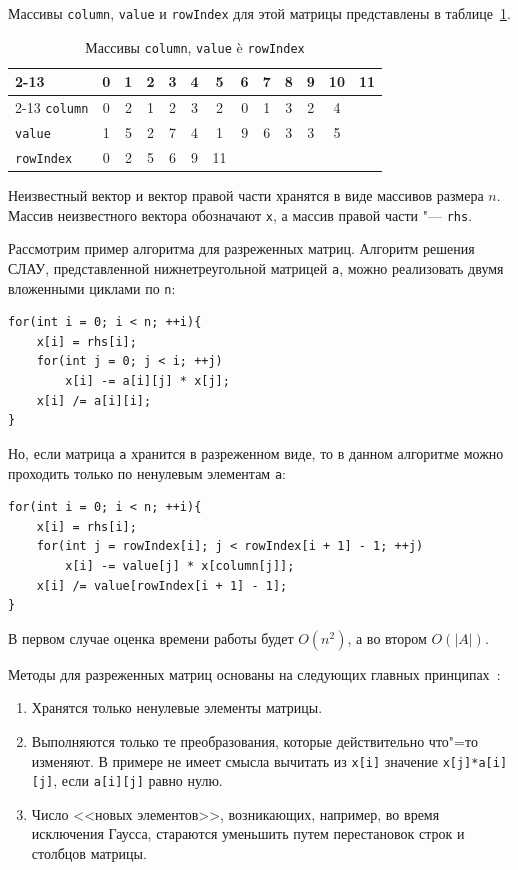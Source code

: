 \documentclass[bachelor, och, coursework]{SCWorks}
\begin{document}
Массивы \verb"column", \verb"value" и \verb"rowIndex" для этой матрицы представлены в таблице~\ref{tab:mat-arrays}.
\begin{table}[ht]\small
	\caption{Массивы \texttt{column}, \texttt{value} è \texttt{rowIndex}}\label{tab:mat-arrays}
	\begin{tabular}{|l|c|c|c|c|c|c|c|c|c|c|c|c|} \cline{2-13}
		\multicolumn{1}{c|}{} & 0 & 1 & 2 & 3 & 4 & 5 & 6 & 7 & 8 & 9 & 10 & 11 \\ \cline{2-13}\hline
		\verb"column" & 0 & 2 & 1 & 2 & 3 & 2 & 0 & 1 & 3 & 2 & 4 &  \\ \hline\hline
		\verb"value" & 1 & 5 & 2 & 7 & 4 & 1 & 9 & 6 & 3 & 3 & 5 &  \\ \hline\hline
		\verb"rowIndex" & 0 & 2 & 5 & 6 & 9 & 11 &  &  &  &  &  &  \\ \hline
	\end{tabular}
\end{table}

Неизвестный вектор и вектор правой части хранятся в виде массивов размера $n$. Массив неизвестного вектора обозначают \verb"x", а массив правой части "--- \verb"rhs".

Рассмотрим пример алгоритма для разреженных матриц. Алгоритм решения СЛАУ, представленной нижнетреугольной матрицей \verb"a", можно реализовать двумя вложенными циклами по \verb"n":
\begin{verbatim}
for(int i = 0; i < n; ++i){
	x[i] = rhs[i];
	for(int j = 0; j < i; ++j)
		x[i] -= a[i][j] * x[j];
	x[i] /= a[i][i];
}
\end{verbatim}

Но, если матрица \verb"a" хранится в разреженном виде, то в данном алгоритме можно проходить только по ненулевым элементам \verb"a":
\begin{verbatim}
for(int i = 0; i < n; ++i){
	x[i] = rhs[i];
	for(int j = rowIndex[i]; j < rowIndex[i + 1] - 1; ++j)
		x[i] -= value[j] * x[column[j]];
	x[i] /= value[rowIndex[i + 1] - 1];
}
\end{verbatim}

В первом случае оценка времени работы будет $O(n^{2})$, а во втором $O(|A|)$.

Методы для разреженных матриц основаны на следующих главных принципах~\cite{matrix_87}:

\begin{enumerate}
    \item  Хранятся только ненулевые элементы матрицы.
    \item  Выполняются только те преобразования, которые действительно что"=то изменяют. В примере не имеет смысла вычитать из \verb"x[i]" значение \verb"x[j]*a[i][j]", если \verb"a[i][j]" равно нулю.
    \item  Число <<новых элементов>>, возникающих, например, во время исключения Гаусса, стараются уменьшить путем перестановок строк и столбцов матрицы.
\end{enumerate}
\end{document}

